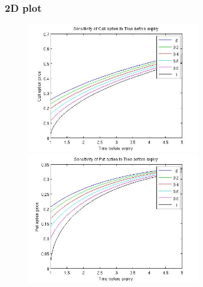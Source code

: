\documentclass[12pt]{article}
\begin{document}
    \subsubsection*{2D plot}
    \begin{figure}[ht]
    \centering
      \begin{minipage}{.45\textwidth}
        \centering
        \includegraphics[width=3in]{call-time.jpg}
      \end{minipage}
      \begin{minipage}{.45\textwidth}
        \centering
        \includegraphics[width=3in]{put-time.jpg}
      \end{minipage}
    \end{figure}
\end{document}
